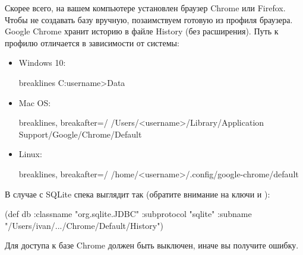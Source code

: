 \begin{english}
  \begin{clojure}
  \end{clojure}
\end{english}

Скорее всего, на вашем компьютере установлен браузер Chrome или Firefox. Чтобы не создавать базу вручную, позаимствуем готовую из профиля браузера. Google Chrome хранит историю в файле History (без расширения). Путь к профилю отличается в зависимости от системы:

\begin{itemize}

\item{Windows 10:
\begin{english}
  \begin{text*}{breaklines}
C:\Users\<username>\AppData\Local\Google\Chrome\User Data\Default
  \end{text*}
\end{english}}

\pagebreaklarge

\item{Mac OS:
\begin{english}
  \begin{text*}{breaklines, breakafter=/}
/Users/<username>/Library/Application Support/Google/Chrome/Default
  \end{text*}
\end{english}}

\item{Linux:
\begin{english}
  \begin{text*}{breaklines, breakafter=/}
/home/<username>/.config/google-chrome/default
  \end{text*}
\end{english}}

\end{itemize}

В случае с SQLite спека выглядит так (обратите внимание на ключи  и ):

\begin{english}
  \begin{clojure}
(def db
  {:classname "org.sqlite.JDBC"
   :subprotocol "sqlite"
   :subname "/Users/ivan/.../Chrome/Default/History"})
  \end{clojure}
\end{english}

Для доступа к базе Chrome должен быть выключен, иначе вы получите ошибку.

